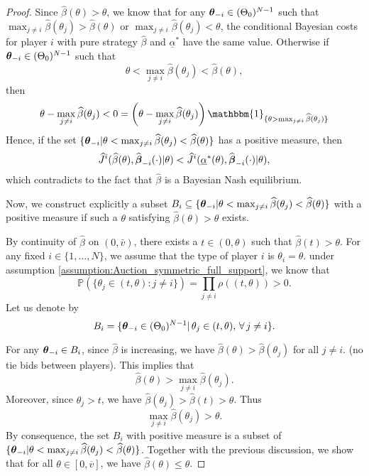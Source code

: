 \begin{proof}
	Since $\hat{\beta}(\theta) > \theta$, we know that for any $\boldsymbol{\theta}_{-i} \in (\Theta_0)^{N-1}$ such that $\max_{j\neq i } \hat{\beta}(\theta_j) > \hat{\beta}(\theta)$ or $\max_{j\neq i } \hat{\beta}(\theta_j) < \theta$, the conditional Bayesian costs for player $i$ with pure strategy $\hat{\beta}$ and $\underline{\alpha}^*$ have the same value. Otherwise if $\boldsymbol{\theta}_{-i} \in (\Theta_0)^{N-1}$ such that
	$$
		\theta < \max_{j\neq i} \hat{\beta}(\theta_j) < \hat{\beta}(\theta),
	$$
	then 
	$$
	\theta - \max_{j\neq i} \hat{\beta}(\theta_j)  < 0 = \left(\theta - \max_{j\neq i} \hat{\beta}(\theta_j) \right) \mathbbm{1}_{ \{ \theta > \max_{j \neq i} \hat{\beta}(\theta_j)  \} }
	$$
	Hence, if the set $\{\boldsymbol{\theta}_{-i} | \theta < \max_{j \neq i}\widehat{\beta}(\theta_j) < \widehat{\beta}(\theta) \}$ has a positive measure, then 
	$$
		\widehat{J}^i(\widehat{\beta}(\theta), \widehat{\boldsymbol{\beta}}_{-i}(\cdot) | \theta) < \widehat{J}^i(\underline{\alpha}^*(\theta), \widehat{\boldsymbol{\beta}}_{-i}(\cdot) | \theta),
	$$
	which contradicts to the fact that $\hat{\beta}$ is a Bayesian Nash equilibrium.
	
	Now, we construct explicitly a subset $B_i \subseteq \{ \boldsymbol{\theta}_{-i} | \theta < \max_{j \neq i}\widehat{\beta}(\theta_j) < \widehat{\beta}(\theta) \}$ with a positive measure if such a $\theta$ satisfying $\hat{\beta}(\theta) > \theta$ exists.	
	
	By continuity of $\hat{\beta}$ on $(0, \bar{v})$, there exists a $t \in (0, \theta)$ such that $\hat{\beta}(t) > \theta$. For any fixed $i\in \{1,\ldots,N\}$, we assume that the type of player $i$ is $\theta_i = \theta$. under assumption \ref{assumption:Auction_symmetric_full_support}, we know that
	$$
		\mathbb{P}( \{ \theta_j \in (t, \theta) : j \neq i \} ) = \prod_{j\neq i} \rho((t, \theta) ) > 0.
	$$
	Let us denote by 
	$$
	B_i = \{ \boldsymbol{\theta}_{-i} \in (\Theta_0)^{N-1} | \, \theta_j \in (t, \theta), \, \forall \, j\neq i\}.
	$$	
	
	For any $\boldsymbol{\theta}_{-i} \in B_i$, since $\hat{\beta}$ is increasing, we have $\hat{\beta}(\theta) > \hat{\beta}(\theta_j)$ for all $j\neq i$. (no tie bids between players). This implies that 
	$$
		\hat{\beta}(\theta) > \max_{j \neq i} \hat{\beta}(\theta_j).
	$$
	Moreover, since $\theta_j > t$, we have $\hat{\beta}(\theta_j) > \hat{\beta}(t) > \theta$.
	Thus
	$$
		\max_{j \neq i} \hat{\beta}(\theta_j) > \theta.
	$$
	By consequence, the set $B_i$ with positive measure is a subset of $ \{ \boldsymbol{\theta}_{-i} | \theta < \max_{j \neq i}\widehat{\beta}(\theta_j) < \widehat{\beta}(\theta) \}$. 
	Together with the previous discussion, we show that for all $\theta \in [0, \overline{v}]$, we have $\hat{\beta}(\theta) \leq \theta$.
	

\end{proof}
